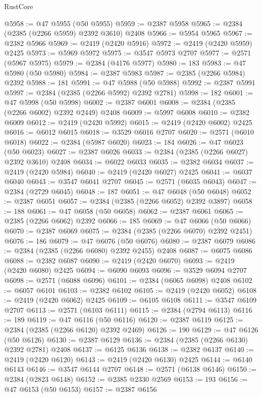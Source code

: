 \begin{lexlean}{RustCore}
\begin{coremodule}
@5958 := @47 @5955 (@50 @5955)
@5959 := @2387 @5958
@5965 := @2384 (@2385 (@2266 @5959) @2392 @3610) @2408
@5966 := @5954 @5965
@5967 := @2382 @5966
@5969 := @2419 (@2420 @5916)
@5972 := @2419 (@2420 @5959) @2425
@5973 := @5969 @5972
@5975 := @3547 @5973 @2707
@5977 := @2571 (@5967 @5975)
@5979 := @2384 (@4176 @5977)
@5980 := 183
@5983 := @47 @5980 (@50 @5980)
@5984 := @2387 @5983
@5987 := @2385 (@2266 @5984) @2392
@5988 := 181
@5991 := @47 @5988 (@50 @5988)
@5992 := @2387 @5991
@5997 := @2384 (@2385 (@2266 @5992) @2392 @2781)
@5998 := 182
@6001 := @47 @5998 (@50 @5998)
@6002 := @2387 @6001
@6008 := @2384 (@2385 (@2266 @6002) @2392 @2449) @2408
@6009 := @5997 @6008
@6010 := @2382 @6009
@6012 := @2419 (@2420 @5992)
@6015 := @2419 (@2420 @6002) @2425
@6016 := @6012 @6015
@6018 := @3529 @6016 @2707
@6020 := @2571 (@6010 @6018)
@6022 := @2384 (@5987 @6020)
@6023 := 184
@6026 := @47 @6023 (@50 @6023)
@6027 := @2387 @6026
@6033 := @2384 (@2385 (@2266 @6027) @2392 @3610) @2408
@6034 := @6022 @6033
@6035 := @2382 @6034
@6037 := @2419 (@2420 @5984)
@6040 := @2419 (@2420 @6027) @2425
@6041 := @6037 @6040
@6043 := @3547 @6041 @2707
@6045 := @2571 (@6035 @6043)
@6047 := @2384 (@2729 @6045)
@6048 := 187
@6051 := @47 @6048 (@50 @6048)
@6052 := @2387 @6051
@6057 := @2384 (@2385 (@2266 @6052) @2392 @3897)
@6058 := 188
@6061 := @47 @6058 (@50 @6058)
@6062 := @2387 @6061
@6065 := @2385 (@2266 @6062) @2392
@6066 := 185
@6069 := @47 @6066 (@50 @6066)
@6070 := @2387 @6069
@6075 := @2384 (@2385 (@2266 @6070) @2392 @2451)
@6076 := 186
@6079 := @47 @6076 (@50 @6076)
@6080 := @2387 @6079
@6086 := @2384 (@2385 (@2266 @6080) @2392 @2455) @2408
@6087 := @6075 @6086
@6088 := @2382 @6087
@6090 := @2419 (@2420 @6070)
@6093 := @2419 (@2420 @6080) @2425
@6094 := @6090 @6093
@6096 := @3529 @6094 @2707
@6098 := @2571 (@6088 @6096)
@6101 := @2384 (@6065 @6098) @2408
@6102 := @6057 @6101
@6103 := @2382 @6102
@6105 := @2419 (@2420 @6052)
@6108 := @2419 (@2420 @6062) @2425
@6109 := @6105 @6108
@6111 := @3547 @6109 @2707
@6113 := @2571 (@6103 @6111)
@6115 := @2384 (@2794 @6113)
@6116 := 189
@6119 := @47 @6116 (@50 @6116)
@6120 := @2387 @6119
@6125 := @2384 (@2385 (@2266 @6120) @2392 @2469)
@6126 := 190
@6129 := @47 @6126 (@50 @6126)
@6130 := @2387 @6129
@6136 := @2384 (@2385 (@2266 @6130) @2392 @2781) @2408
@6137 := @6125 @6136
@6138 := @2382 @6137
@6140 := @2419 (@2420 @6120)
@6143 := @2419 (@2420 @6130) @2425
@6144 := @6140 @6143
@6146 := @3547 @6144 @2707
@6148 := @2571 (@6138 @6146)
@6150 := @2384 (@2823 @6148)
@6152 := @2385 @2330 @2569
@6153 := 193
@6156 := @47 @6153 (@50 @6153)
@6157 := @2387 @6156

\end{coremodule}
\end{lexlean}

